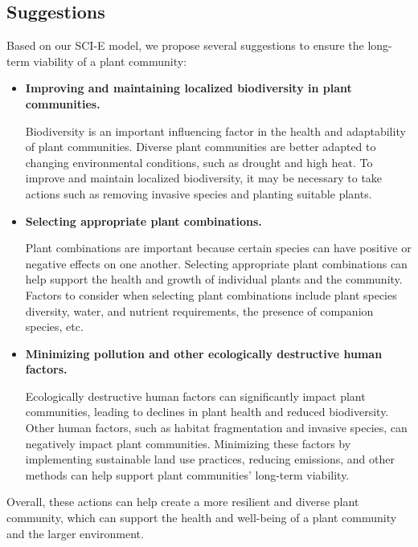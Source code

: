 \documentclass{mcmthesis}
\begin{document}
\subsection{Suggestions}

\indent

Based on our SCI-E model, we propose several suggestions to ensure the long-term viability of a plant community:


\begin{itemize}
\item \textbf{Improving and maintaining localized biodiversity in plant communities.}

Biodiversity is an important influencing factor in the health and adaptability of plant communities. Diverse plant communities are better adapted to changing environmental conditions, such as drought and high heat. To improve and maintain localized biodiversity, it may be necessary to take actions such as removing invasive species and planting suitable plants.
 
 \item \textbf{Selecting appropriate plant combinations. }

Plant combinations are important because certain species can have positive or negative effects on one another. Selecting appropriate plant combinations can help support the health and growth of individual plants and the community. Factors to consider when selecting plant combinations include plant species diversity, water, and nutrient requirements, the presence of companion species, etc.
 
 
\item \textbf{Minimizing pollution and other ecologically destructive human factors.}

Ecologically destructive human factors can significantly impact plant communities, leading to declines in plant health and reduced biodiversity. Other human factors, such as habitat fragmentation and invasive species, can negatively impact plant communities. Minimizing these factors by implementing sustainable land use practices, reducing emissions, and other methods can help support plant communities' long-term viability.

\end{itemize}

 Overall, these actions can help create a more resilient and diverse plant community, which can support the health and well-being of a plant community and the larger environment.
\end{document}

